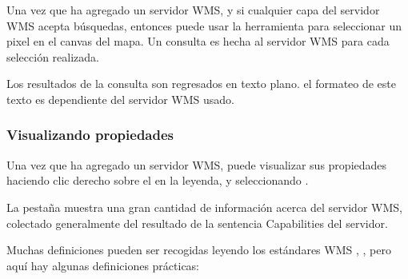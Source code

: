 Una vez que ha agregado un servidor WMS, y si cualquier capa del servidor WMS  
acepta búsquedas, entonces puede usar la herramienta  para seleccionar un pixel en el canvas del mapa.
Un consulta es hecha al servidor WMS para cada selección realizada.

Los resultados de la consulta  son regresados en texto plano.
el formateo de este texto es dependiente del servidor WMS usado.

\subsubsection{Visualizando propiedades}\label{sec:ogc-wms-properties}

Una vez que ha agregado un servidor WMS, puede visualizar sus propiedades haciendo clic derecho sobre el en la leyenda, y seleccionando .


\label{sec:ogc-wms-properties-metadata}

La pestaña  muestra una gran cantidad de información acerca del servidor WMS, colectado generalmente del resultado de la sentencia Capabilities del servidor.

Muchas definiciones pueden ser recogidas leyendo los estándares WMS
\cite{OGCWMS010101web}, \cite{OGCWMS010300web}, pero aquí hay algunas definiciones prácticas:

